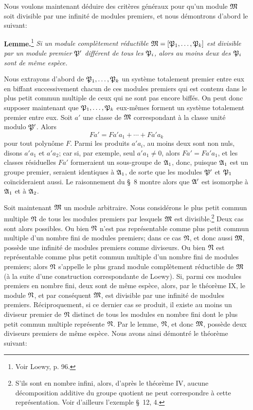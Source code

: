 Nous voulons maintenant déduire des critères généraux pour qu'un module $\mathfrak{M}$ soit divisible par une infinité de modules premiers, et nous démontrons d'abord le suivant:

\textbf{Lemme.}\footnote{Voir Loewy, p. 96.} \emph{Si un module complètement réductible $\mathfrak{M}=[\mathfrak P_1,\ldots,\mathfrak P_k]$ est divisible par un module premier $\mathfrak P'$ différent de tous les $\mathfrak P_i$, alors au moins deux des $\mathfrak P_i$ sont de même espèce.}

Nous extrayons d'abord de $\mathfrak P_1,\ldots,\mathfrak P_k$ un système totalement premier entre eux en biffant successivement chacun de ces modules premiers qui est contenu dans le plus petit commun multiple de ceux qui ne sont pas encore biffés. On peut donc supposer maintenant que $\mathfrak P_1,\ldots,\mathfrak P_k$ eux-mêmes forment un système totalement premier entre eux. Soit $a'$ une classe de $\mathfrak{M}$ correspondant à la classe unité modulo $\mathfrak P'$. Alors
\[
 Fa'=Fa'a_1+\cdots+Fa'a_k
\]
pour tout polynôme $F$. Parmi les produits $a'a_i$, au moins deux sont non nuls, disons $a'a_1$ et $a'a_2$; car si, par exemple, seul $a'a_1\ne0$, alors $Fa'=Fa'a_1$, et les classes résiduelles $Fa'$ formeraient un sous-groupe de $\mathfrak{A}_1$, donc, puisque $\mathfrak{A}_1$ est un groupe premier, seraient identiques à $\mathfrak{A}_1$, de sorte que les modules $\mathfrak P'$ et $\mathfrak P_1$ coïncideraient aussi. Le raisonnement du \S~8 montre alors que $\mathfrak{A}'$ est isomorphe à $\mathfrak{A}_1$ et à $\mathfrak{A}_2$.

Soit maintenant $\mathfrak{M}$ un module arbitraire. Nous considérons le plus petit commun multiple $\mathfrak{N}$ de tous les modules premiers par lesquels $\mathfrak{M}$ est divisible.\footnote{S'ils sont en nombre infini, alors, d'après le théorème IV, aucune décomposition additive du groupe quotient ne peut correspondre à cette représentation. Voir d'ailleurs l'exemple \S~12, 4.} Deux cas sont alors possibles. Ou bien $\mathfrak{N}$ n'est pas représentable comme plus petit commun multiple d'un nombre fini de modules premiers; dans ce cas $\mathfrak{N}$, et donc aussi $\mathfrak{M}$, possède une infinité de modules premiers comme diviseurs. Ou bien $\mathfrak{N}$ est représentable comme plus petit commun multiple d'un nombre fini de modules premiers; alors $\mathfrak{N}$ s'appelle le plus grand module complètement réductible de $\mathfrak{M}$ (à la suite d'une construction correspondante de Loewy). Si, parmi ces modules premiers en nombre fini, deux sont de même espèce, alors, par le théorème IX, le module $\mathfrak{N}$, et par conséquent $\mathfrak{M}$, est divisible par une infinité de modules premiers. Réciproquement, si ce dernier cas se produit, il existe au moins un diviseur premier de $\mathfrak{N}$ distinct de tous les modules en nombre fini dont le plus petit commun multiple représente $\mathfrak{N}$. Par le lemme, $\mathfrak{N}$, et donc $\mathfrak{M}$, possède deux diviseurs premiers de même espèce. Nous avons ainsi démontré le théorème suivant:

